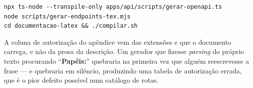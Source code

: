 \begin{lstlisting}[language=bashunoo, caption={Regerar o documento e o apêndice}]
npx ts-node --transpile-only apps/api/scripts/gerar-openapi.ts
node scripts/gerar-endpoints-tex.mjs
cd documentacao-latex && ./compilar.sh
\end{lstlisting}

\begin{nota}
A coluna de autorização do apêndice vem das extensões  e
 que o documento carrega, e não da prosa da descrição. Um gerador
que fizesse \emph{parsing} do próprio texto procurando
\enquote{\textbf{Papéis:}} quebraria na primeira vez que alguém reescrevesse a
frase --- e quebraria em silêncio, produzindo uma tabela de autorização errada,
que é o pior defeito possível num catálogo de rotas.
\end{nota}
